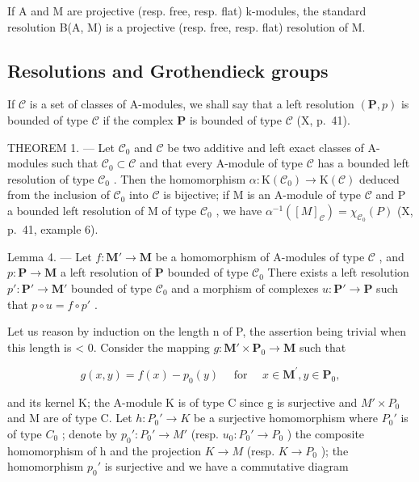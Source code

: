 If A and M are projective (resp. free, resp. flat) k-modules, the standard resolution B(A, M) is a projective (resp. free, resp. flat) resolution of M.

\subsection{Resolutions and Grothendieck groups}

If \(\mathcal{C}\) is a set of classes of A-modules, we shall say that a left resolution \((\mathbf{P}, p)\) is bounded of type \(\mathcal{C}\) if the complex \(\mathbf{P}\) is bounded of type \(\mathcal{C}\) (X, p.~41).

THEOREM 1. --- Let \(\mathcal{C}_{0}\) and \(\mathcal{C}\) be two additive and left exact classes of A-modules such that \(\mathcal{C}_{0} \subset \mathcal{C}\) and that every A-module of type \(\mathcal{C}\) has a bounded left resolution of type \(\mathcal{C}_{0}\) . Then the homomorphism \(\alpha : \mathrm{K}(\mathcal{C}_{0}) \to \mathrm{K}(\mathcal{C})\) deduced from the inclusion of \(\mathcal{C}_{0}\) into \(\mathcal{C}\) is bijective; if M is an A-module of type \(\mathcal{C}\) and P a bounded left resolution of M of type \(\mathcal{C}_{0}\) , we have \(\alpha^{-1}([M]_{\mathcal{C}}) = \chi_{\mathcal{C}_{0}}(P)\) (X, p.~41, example 6).

Lemma 4. --- Let \(f: \mathbf{M}' \to \mathbf{M}\) be a homomorphism of A-modules of type \(\mathcal{C}\) , and \(p: \mathbf{P} \to \mathbf{M}\) a left resolution of \(\mathbf{P}\) bounded of type \(\mathcal{C}_0\) There exists a left resolution \(p': \mathbf{P}' \to \mathbf{M}'\) bounded of type \(\mathcal{C}_0\) and a morphism of complexes \(u: \mathbf{P}' \to \mathbf{P}\) such that \(p \circ u = f \circ p'\) .

Let us reason by induction on the length n of P, the assertion being trivial when this length is \textless{} 0. Consider the mapping \(g: \mathbf{M}' \times \mathbf{P}_0 \to \mathbf{M}\) such that

\[
g (x, y) = f (x) - p _ {0} (y) \quad \text { for } \quad x \in \mathbf {M} ^ {\prime}, y \in \mathbf {P} _ {0},
\]

and its kernel K; the A-module K is of type C since g is surjective and \(M' \times P_{0}\) and M are of type C. Let \(h : P_{0}' \to K\) be a surjective homomorphism where \(P_{0}'\) is of type \(C_{0}\) ; denote by \(p_{0}' : P_{0}' \to M'\) (resp. \(u_{0} : P_{0}' \to P_{0}\) ) the composite homomorphism of h and the projection \(K \to M\) (resp. \(K \to P_{0}\) ); the homomorphism \(p_{0}'\) is surjective and we have a commutative diagram

